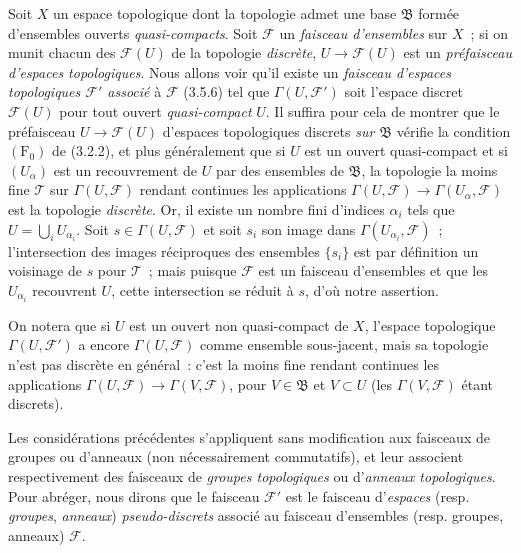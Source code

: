 \begin{env}[3.8.1]
\label{0.3.8.1-fr}
Soit $X$ un espace topologique dont la topologie admet une base
$\mathfrak{B}$ formée d'ensembles ouverts \emph{quasi-compacts}. Soit
$\mathcal{F}$ un \emph{faisceau d'ensembles} sur $X$~; si on munit chacun des
$\mathcal{F}(U)$ de la topologie \emph{discrète},
$U\to\mathcal{F}(U)$ est un \emph{préfaisceau d'espaces topologiques}.
Nous allons voir qu'il existe un \emph{faisceau d'espaces topologiques
$\mathcal{F}'$ associé} à $\mathcal{F}$ (3.5.6) tel que
$\Gamma(U,\mathcal{F}')$ soit l'espace discret $\mathcal{F}(U)$ pour tout
ouvert \emph{quasi-compact} $U$. Il suffira pour cela de montrer que le
préfaisceau $U\to\mathcal{F}(U)$ d'espaces topologiques discrets
\emph{sur $\mathfrak{B}$} vérifie la condition $(\mathrm{F}_0)$ de (3.2.2),
et plus généralement que si $U$ est un ouvert quasi-compact et si
$(U_\alpha)$ est un recouvrement de $U$ par des ensembles de $\mathfrak{B}$,
la topologie la moins fine $\mathcal{T}$ sur $\Gamma(U,\mathcal{F})$ rendant
continues les applications
$\Gamma(U,\mathcal{F})\to\Gamma(U_\alpha,\mathcal{F})$ est la topologie
\emph{discrète}. Or, il existe un nombre fini d'indices $\alpha_i$ tels que
$U=\bigcup_i U_{\alpha_i}$. Soit $s\in\Gamma(U,\mathcal{F})$ et soit $s_i$ son
image dans $\Gamma(U_{\alpha_i},\mathcal{F})$~; l'intersection des images
réciproques des ensembles $\{s_i\}$ est par définition un voisinage de $s$
pour $\mathcal{T}$~; mais puisque $\mathcal{F}$ est un faisceau d'ensembles et
que les $U_{\alpha_i}$ recouvrent $U$, cette intersection se réduit à $s$,
d'où notre assertion.

On notera que si $U$ est un ouvert non quasi-compact de $X$, l'espace
topologique $\Gamma(U,\mathcal{F}')$ a encore $\Gamma(U,\mathcal{F})$ comme
ensemble sous-jacent, mais sa topologie n'est pas discrète en général~:
c'est la moins fine rendant continues les applications
$\Gamma(U,\mathcal{F})\to\Gamma(V,\mathcal{F})$, pour $V\in\mathfrak{B}$ et
$V\subset U$ (les $\Gamma(V,\mathcal{F})$ étant discrets).

Les considérations précédentes s'appliquent sans modification aux faisceaux
de groupes ou d'anneaux (non nécessairement commutatifs), et leur associent
respectivement des faisceaux de \emph{groupes topologiques} ou d'\emph{anneaux
topologiques}. Pour abréger, nous dirons que le faisceau $\mathcal{F}'$ est le
faisceau d'\emph{espaces} (resp. \emph{groupes}, \emph{anneaux})
\emph{pseudo-discrets} associé au faisceau d'ensembles (resp. groupes,
anneaux) $\mathcal{F}$.
\end{env}


